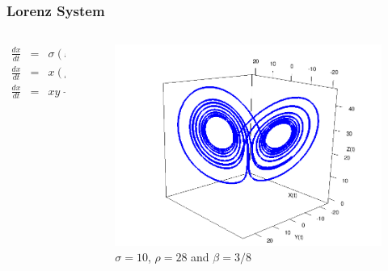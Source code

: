 \documentclass{beamer}
\theoremstyle{definition}
\begin{document}
\begin{frame}
\frametitle{Lorenz System}
  
 \begin{columns}[onlytextwidth]
   \begin{column}{0.3\textwidth}
\begin{eqnarray*} 
 \frac{dx}{dt} &=&\sigma (x-y), \\
 \frac{dx}{dt} &=&x (\rho -z) - y, \\ 
 \frac{dx}{dt} &=&xy - \beta z.
\end{eqnarray*}
\end{column} 
 
 \begin{column}{0.63\textwidth}
      \begin{figure}
\includegraphics[scale=.25]{lorenzattractor}
 \caption{$\sigma=10$, $\rho=28$ and $\beta=3/8$}
      \end{figure}
    \end{column}
 \end{columns}
\end{frame}
\end{document}
